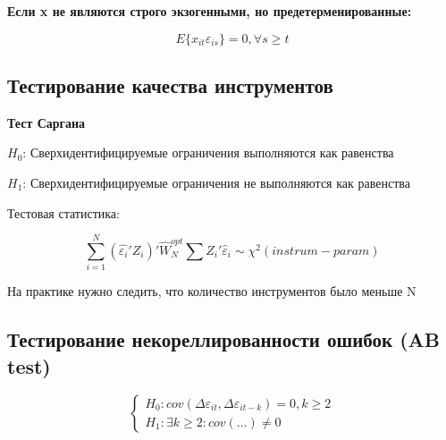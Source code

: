 \documentclass[a4paper, 12pt]{article}
\begin{document}
\textbf{Если x не являются строго экзогенными,
но предетерменированные:}

\[E\{x_{it}\varepsilon_{is}\} = 0, \forall s \geq t\]

\subsection{Тестирование качества инструментов}

\textbf{Тест Саргана}

\begin{center}
    $H_0$: Сверхидентифицируемые ограничения выполняются как равенства

    $H_1$: Сверхидентифицируемые ограничения не выполняются как равенства
\end{center}

Тестовая статистика:

\[\sum_{i = 1}^N (\hat{\varepsilon_i}'Z_i)'\hat{W}_N^{opt}\sum Z_i' \hat{\varepsilon}_i 
\sim \chi^2(instrum - param)\]

На практике нужно следить, что количество инструментов было меньше N

\subsection{Тестирование некореллированности ошибок (AB test)}

\[
\begin{cases}
    H_0: cov(\Delta \varepsilon_{it}, \Delta \varepsilon_{it - k}) = 0, k \geq 2 \\
    H_1: \exists k \geq 2: cov(\ldots) \neq 0
\end{cases}    
\]
\end{document}
